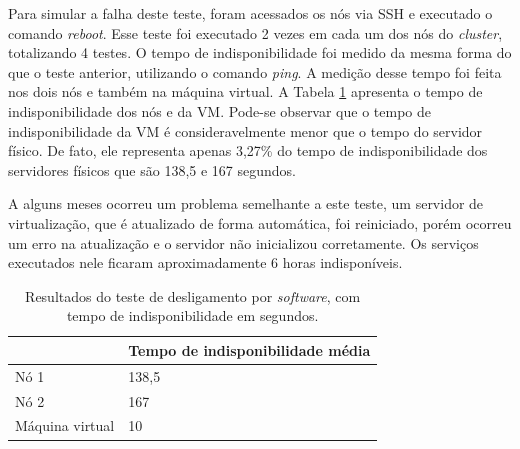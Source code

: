 Para simular a falha deste teste, foram acessados os nós via \ac{SSH} e executado o comando \textit{reboot}.
Esse teste foi executado 2 vezes em cada um dos nós do \textit{cluster}, totalizando 4 testes. O tempo de indisponibilidade foi medido da mesma 
forma do que o teste anterior, utilizando o comando \textit{ping}. A medição desse tempo foi feita nos dois nós e também na máquina virtual. 
A Tabela \ref{tab:teste2resultados} apresenta o tempo de indisponibilidade dos nós e da \ac{VM}. 
Pode-se observar que o tempo de indisponibilidade da \ac{VM} é consideravelmente menor que o tempo do servidor físico. De fato, ele representa 
apenas 3,27\% do tempo de indisponibilidade dos servidores físicos que são 138,5 e 167 segundos. 

A alguns meses ocorreu um problema semelhante a este teste, um servidor de virtualização, que é atualizado de forma automática, foi reiniciado, 
porém ocorreu um erro na atualização e o servidor não inicializou corretamente. Os serviços executados nele ficaram aproximadamente 
6 horas indisponíveis.



\begin{table}[h!]
\caption{Resultados do teste de desligamento por \textit{software}, com tempo de indisponibilidade em segundos.}
\small
\label{tab:teste2resultados}
\begin{center}
\begin{tabular}{|l|l|}\hline
 & \textbf{Tempo de indisponibilidade média} \\\hline %
Nó 1 & 138,5 \\\hline %
Nó 2 & 167 \\\hline %
Máquina virtual & 10 \\\hline %
\end{tabular}
\end{center}
\end{table}

